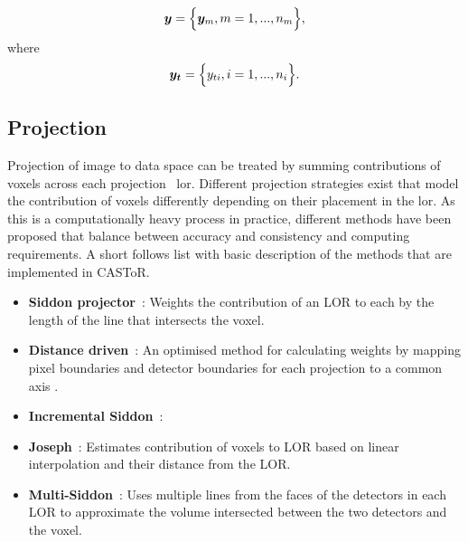 \begin{equation}
   \bm{y} = \Big\{ {\bm{y}_m,m=1,...,n_m} \Big\} \\,
\end{equation}
where
\begin{equation}
   \bm{y_t} = \Big\{ {y_{ti},i=1,...,n_i} \Big\} \\.
\end{equation}


\subsection{Projection}
Projection of image to data space can be treated by summing contributions of voxels across each projection ~\gls{lor}. Different projection strategies exist that model the contribution of voxels differently depending on their placement in the \gls{lor}. As this is a computationally heavy process in practice, different methods have been proposed that balance between accuracy and consistency and computing requirements. A short follows list with basic description of the methods that are implemented in CASToR.

\begin{itemize}
\item  \textbf{Siddon projector}~\cite{Siddon1985}: Weights the contribution of an LOR to each by the length of the line that intersects the voxel.
\item  \textbf{Distance driven}~\cite{DeMan2004}: An optimised method for calculating weights by mapping pixel boundaries and detector boundaries for each projection to a common axis .
\item  \textbf{Incremental Siddon}~\cite{Jacobs2015}:
\item  \textbf{Joseph}~\cite{Joseph1982}: Estimates contribution of voxels to LOR based on linear interpolation and their distance from the LOR. 
\item  \textbf{Multi-Siddon}~\cite{Moehrs2008}: Uses multiple lines from the faces of the detectors in each LOR to approximate the volume intersected between the two detectors and the voxel.
\end{itemize}

